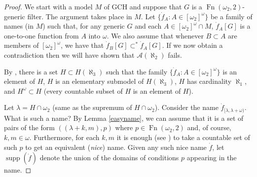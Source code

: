 \documentclass{rmmcart}
\theoremstyle{plain}
\theoremstyle{definition}
\theoremstyle{remark}
\theoremstyle{plain}
\theoremstyle{definition}
\theoremstyle{remark}
\begin{document}
            \begin{proof}
            We start with a model $M$ of GCH and suppose that $G$ is a
            $\operatorname{Fn}(\omega_2,2)$-generic filter. The argument takes
            place in $M$.
            Let $\{ \dot f_{A} : A\in [\omega_2]^\omega\}$ be a family of
            names (in $M$)
             such that, for any generic $G$ and each $A\in [\omega_2]^\omega\cap
             M$,
             $\dot f_{A}[G]$ is a one-to-one function from $A$ into
            $\omega$.  We also assume that whenever $B\subset A$ are members of
            $[\omega_2]^\omega$, we have that $\dot f_{B}[G]\subset^* \dot
            f_{A}[G]$. If we now obtain a contradiction
            then we will have shown that $\mathcal A(\aleph_2)$ fails.

            By \cite[1.5]{MR1031969}, there is a set $H\subset H(\aleph_3)$
            such that the family $\{ \dot f_{A} : A\in [\omega_2]^{\omega}\}$ is an
            element of $H$,  $H$ is an elementary submodel of
            $ H(\aleph_3)$, $H$ has cardinality
            $\aleph_1$, and $H^\omega\subset H$ (every
             countable subset of $H$ is an element of $H$).



            Let $\lambda = H\cap \omega_2$ (same as the supremum of $H\cap
            \omega_2$). Consider the name  $\dot f_{[\lambda,\lambda+\omega)}$.
            What is such a name?  By Lemma \ref{easyname},
            we can assume that it is a set of pairs
             of the form $( (\lambda+k,m), p)$ where $p\in \mathop{Fn}(\omega_2,
             2)$ and, of course, $k,m\in \omega$.
            Furthermore,  for each $k,m$ it is enough
            (see \cite[5.11,5.12]{MR597342})
            to take a  countable set of such $p$ to get an equivalent
            (\textit{nice}\/) name.
            Given any such nice name $\dot f$, let $\operatorname{supp}(\dot f)$
            denote the union of the domains of conditions $p$ appearing in the
            name.


\end{proof}
\end{document}
